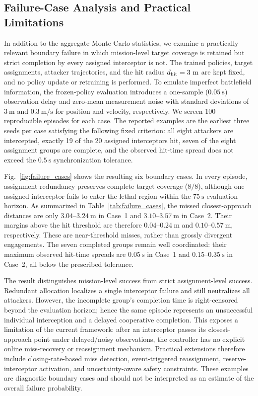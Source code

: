 \subsection{Failure-Case Analysis and Practical Limitations}
\label{subsec:failure_case_analysis}

In addition to the aggregate Monte Carlo statistics, we examine a practically
relevant boundary failure in which mission-level target coverage is retained
but strict completion by every assigned interceptor is not. The trained
policies, target assignments, attacker trajectories, and the hit radius
$d_{\rm hit}=3~\mathrm{m}$ are kept fixed, and no policy update or retraining is
performed. To emulate imperfect battlefield information, the frozen-policy
evaluation introduces a one-sample ($0.05~\mathrm{s}$) observation delay and
zero-mean measurement noise with standard deviations of $3~\mathrm{m}$ and
$0.3~\mathrm{m/s}$ for position and velocity, respectively. We screen 100
reproducible episodes for each case. The reported examples are the earliest
three seeds per case satisfying the following fixed criterion: all eight
attackers are intercepted, exactly 19 of the 20 assigned interceptors hit,
seven of the eight assignment groups are complete, and the observed hit-time
spread does not exceed the $0.5~\mathrm{s}$ synchronization tolerance.

Fig.~\ref{fig:failure_cases} shows the resulting six boundary cases. In every
episode, assignment redundancy preserves complete target coverage
($8/8$), although one assigned interceptor fails to enter the lethal region
within the $75~\mathrm{s}$ evaluation horizon. As summarized in
Table~\ref{tab:failure_cases}, the missed closest-approach distances are only
$3.04$--$3.24~\mathrm{m}$ in Case~1 and $3.10$--$3.57~\mathrm{m}$ in Case~2.
Their margins above the hit threshold are therefore $0.04$--$0.24~\mathrm{m}$
and $0.10$--$0.57~\mathrm{m}$, respectively. These are near-threshold misses,
rather than grossly divergent engagements. The seven completed groups remain
well coordinated: their maximum observed hit-time spreads are
$0.05~\mathrm{s}$ in Case~1 and $0.15$--$0.35~\mathrm{s}$ in Case~2, all below
the prescribed tolerance.

The result distinguishes mission-level success from strict assignment-level
success. Redundant allocation localizes a single interceptor failure and still
neutralizes all attackers. However, the incomplete group's completion time is
right-censored beyond the evaluation horizon; hence the same episode represents
an unsuccessful individual interception and a delayed cooperative completion.
This exposes a limitation of the current framework: after an interceptor passes
its closest-approach point under delayed/noisy observations, the controller has
no explicit online miss-recovery or reassignment mechanism. Practical
extensions therefore include closing-rate-based miss detection,
event-triggered reassignment, reserve-interceptor activation, and
uncertainty-aware safety constraints. These examples are diagnostic boundary
cases and should not be interpreted as an estimate of the overall failure
probability.

